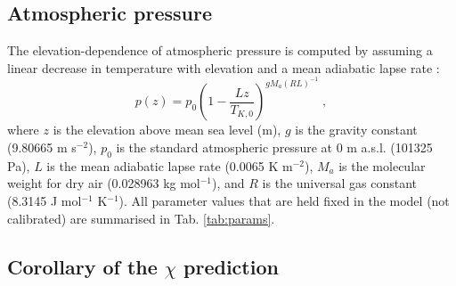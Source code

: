 \documentclass{myreport}
\begin{document}
\subsection{Atmospheric pressure}
\label{sec:press}
The elevation-dependence of atmospheric pressure is computed by assuming a linear decrease in temperature with elevation and a mean adiabatic lapse rate \citep{berberan97}:
\begin{equation}
\label{eq:pz}
    p(z) = p_0 \left( 
    	1 - \frac{L z}{T_{K,0}} 
    \right)^{g M_a (R L)^{-1}} \;,
\end{equation} 
where $z$ is the elevation above mean sea level (m), $g$ is the gravity constant (9.80665 m s$^{-2}$), $p_0$ is the standard atmospheric pressure at 0 m a.s.l. (101325 Pa), $L$ is the mean adiabatic lapse rate (0.0065 K m$^{-2}$), $M_a$ is the molecular weight for dry air (0.028963 kg mol$^{-1}$), and $R$ is the universal gas constant (8.3145 J mol$^{-1}$ K$^{-1}$). All parameter values that are held fixed in the model (not calibrated) are summarised in Tab. \ref{tab:params}.

\subsection{Corollary of the $\chi$ prediction}
\label{sec:corollary}
\end{document}
